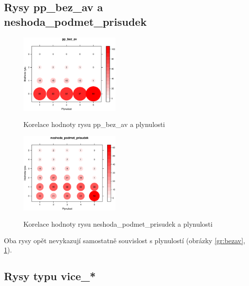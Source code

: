 \documentclass[12pt,a4paper]{report}
\begin{document}
\subsection{Rysy pp\_bez\_av a neshoda\_podmet\_prisudek}
\begin{figure}[!htb]
\begin{center}
  \centering\includegraphics[width=50mm]{./grafy/rysy/pp_bez_av-c.eps}
  \caption{Korelace hodnoty rysu pp\_bez\_av a plynulosti}\label{gr:bezav}
\endminipage\quad
{}
  \centering\includegraphics[width=50mm]{./grafy/rysy/neshoda_podmet_prisudek-c.eps}
  \caption{Korelace hodnoty rysu neshoda\_podmet\_prisudek a plynulosti}\label{gr:neshoda}
\endminipage
\end{center}
\end{figure}

Oba rysy opět nevykazují samostatně souvislost s plynulostí (obrázky \ref{gr:bezav}, \ref{gr:neshoda}). 


\subsection{Rysy typu vice\_*}
\end{document}

